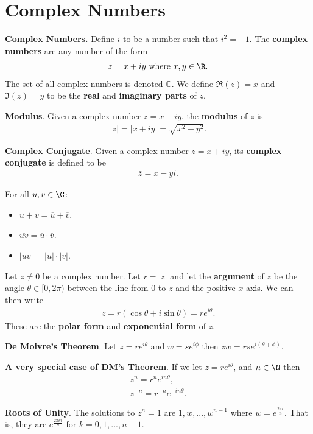 \documentclass{article}
\begin{document}
\section{Complex Numbers}
\begin{definition}
	\textbf{Complex Numbers.} Define $i$ to be a number such that $i^2 = -1$.
	The \textbf{complex numbers} are any number of the form
	\begin{align*}
		z = x+iy \text{ where } x,y\in\R.
	\end{align*}
	The set of all complex numbers is denoted $\mathbb{C}$. We define $\Re(z) = x$ and $\Im(z)=y$ to be the \textbf{real} and \textbf{imaginary parts} of $z$.
\end{definition}
\begin{definition}
	\textbf{Modulus}. Given a complex number $z=x+iy$, the \textbf{modulus} of $z$ is
	\begin{align*}
		|z|=|x+iy|=\sqrt{x^2+y^2}.
	\end{align*}
\end{definition}
\begin{definition}
	\textbf{Complex Conjugate}. Given a complex number $z=x+iy$, its \textbf{complex conjugate} is defined to be
	\begin{align*}
		\bar{z}=x-yi.
	\end{align*}
\end{definition}
\begin{theorem}
	For all $u,v\in\C$:
	\begin{itemize}
		\item $\overline{u+v}=\overline{u}+\overline{v}$.
		\item $\overline{uv}=\overline{u}\cdot\overline{v}$.
		\item $|uv|=|u|\cdot|v|$.
	\end{itemize}
\end{theorem}
\begin{definition}
	Let $z\not=0$ be a complex number.
	Let $r=|z|$ and let the \textbf{argument} of $z$ be the angle $\theta\in[0,2\pi)$ between the line from $0$ to $z$ and the positive $x$-axis. We can then write
	\begin{align*}
		z = r(\cos\theta+i\sin\theta)=re^{i\theta}.
	\end{align*}
	These are the \textbf{polar form} and \textbf{exponential form} of $z$.
\end{definition}
\begin{theorem}
	\textbf{De Moivre's Theorem}. Let $z=re^{i\theta}$ and $w=se^{i\phi}$ then $zw=rse^{i(\theta+\phi)}$.
\end{theorem}
\begin{theorem}
	\textbf{A very special case of DM's Theorem}. If we let $z=re^{i\theta}$, and $n\in\N$ then
	\begin{align*}
		z^n = r^ne^{in\theta}, \\
		z^{-n} = r^{-n}e^{-in\theta}.
	\end{align*}
\end{theorem}
\begin{theorem}
	\textbf{Roots of Unity}. The solutions to $z^n=1$ are $1,w,...,w^{n-1}$ where $w=e^{\frac{2\pi i}{n}}$. That is, they are $e^{\frac{2\pi ki}{n}}$ for $k=0,1,...,n-1$.
\end{theorem}
\end{document}
